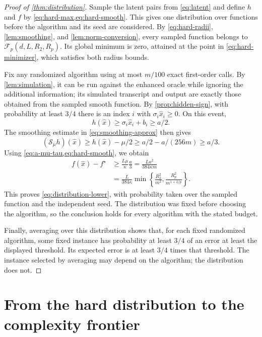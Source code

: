 \documentclass[11pt]{article}
\newcommand{\cF}{\mathcal{F}}
\newcommand{\cS}{\mathcal{S}}
\theoremstyle{definition}
\theoremstyle{remark}
\begin{document}
\begin{proof}[Proof of \cref{thm:distribution}]
Sample the latent pairs from \cref{eq:latent} and define $h$ and $f$ by
\cref{eq:hard-max,eq:hard-smooth}.  This gives one distribution over
functions before the algorithm and its seed are considered.  By
\cref{eq:hard-radii}, \cref{lem:smoothing}, and
\cref{lem:norm-conversion}, every sampled function belongs to
$\cF_p(d,L,R_2,R_p)$.  Its global minimum is zero, attained at the point
in \cref{eq:hard-minimizer}, which satisfies both radius bounds.

Fix any randomized algorithm using at most $m/100$ exact first-order
calls.  By \cref{lem:simulation}, it can be run against the enhanced
oracle while ignoring the additional information; its simulated
transcript and output are exactly those obtained from the sampled
smooth function.  By \cref{prop:hidden-sign}, with probability at least
$3/4$ there is an index $i$ with $\sigma_i\widehat x_i\ge0$.  On this
event,
\[
 h(\widehat x)\ge\sigma_i\widehat x_i+b_i\ge a/2.
\]
The smoothing estimate in \cref{eq:smoothing-approx} then gives
\[
 (\cS_\mu h)(\widehat x)
 \ge h(\widehat x)-\mu/2
 \ge a/2-a/(256m)
 \ge a/3.
\]
Using \cref{eq:a-mu-tau,eq:hard-smooth}, we obtain
\begin{align*}
 f(\widehat x)-f^\star
 &\ge\frac{L\mu}{\kappa}\frac a3
 =\frac{La^2}{384\kappa m}\\
 &=\frac{L}{384\kappa}
   \min\left\{
       \frac{R_2^2}{m^2},
       \frac{R_p^2}{m^{1+2/p}}
   \right\}.
\end{align*}
This proves \cref{eq:distribution-lower}, with probability taken over
the sampled function and the independent seed.  The distribution was
fixed before choosing the algorithm, so the conclusion holds for every
algorithm with the stated budget.

Finally, averaging over this distribution shows that, for each fixed
randomized algorithm, some fixed instance has probability at least $3/4$ of an error at least
the displayed threshold.  Its expected error is at least $3/4$ times
that threshold.  The instance selected by averaging
may depend on the algorithm; the distribution does not.
\end{proof}

\section{From the hard distribution to the complexity frontier}
\label{app:main-theorem}
\end{document}
